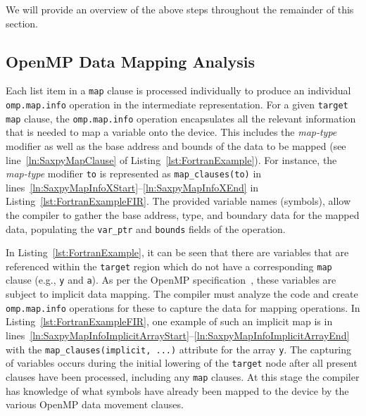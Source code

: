 \documentclass[acmtog,natbib=false]{acmart}
\newcommand{\code}[1]{\texttt{#1}\xspace}
\begin{document}
We will provide an overview of the above steps throughout the remainder of this section.

\subsection{OpenMP Data Mapping Analysis}
\label{sec:OpenMPDataMappingAnalysis}

Each list item in a \code{map} clause is processed individually to produce an individual \code{omp.map.info} operation in the intermediate representation. 
For a given \code{target} \code{map} clause, the \code{omp.map.info} operation encapsulates all the relevant information that is needed to map a variable onto the device.
This includes the \textit{map-type} modifier as well as the base address and bounds of the data to be mapped (see line~\ref{ln:SaxpyMapClause} of Listing~\ref{lst:FortranExample}).
For instance, the \textit{map-type} modifier \code{to} is represented as \code{map\_clauses(to)} in lines~\ref{ln:SaxpyMapInfoXStart}--\ref{ln:SaxpyMapInfoXEnd} in Listing~\ref{lst:FortranExampleFIR}.
The provided variable names (symbols), allow the compiler to gather the base address, type, and boundary data for the mapped data, populating the \code{var\_ptr} and \code{bounds} fields of the operation. 

In Listing~\ref{lst:FortranExample}, it can be seen that there are variables that are referenced within the \code{target} region which do not have a corresponding \code{map} clause (e.g., \code{y} and \code{a}).
As per the OpenMP specification~\cite{OARB24}, these variables are subject to implicit data mapping.
The compiler must analyze the code and create \code{omp.map.info} operations for these to capture the data for mapping operations. 
In Listing~\ref{lst:FortranExampleFIR}, one example of such an implicit map is in lines~\ref{ln:SaxpyMapInfoImplicitArrayStart}--\ref{ln:SaxpyMapInfoImplicitArrayEnd} with the \code{map\_clauses(implicit, ...)} attribute for the array \code{y}.
The capturing of variables occurs during the initial lowering of the \code{target} node after all present clauses have been processed, including any \code{map} clauses. 
At this stage the compiler has knowledge of what symbols have already been mapped to the device by the various OpenMP data movement clauses.
\end{document}
